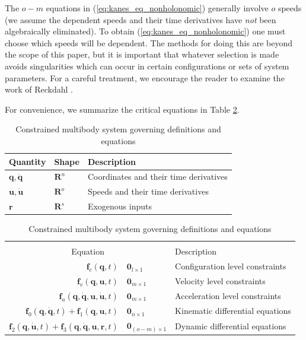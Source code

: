 \documentclass[smallcondensed,final]{svjour3}                     %
\begin{document}
The $o-m$ equations in (\ref{eq:kanes_eq_nonholonomic}) generally involve $o$
speeds (we assume the dependent speeds and their time derivatives have
\textit{not} been algebraically eliminated). To obtain
(\ref{eq:kanes_eq_nonholonomic}) one must choose which speeds will be
dependent.  The methods for doing this are beyond the scope of this paper, but
it is important that whatever selection is made avoids singularities which can
occur in certain configurations or sets of system parameters. For a careful
treatment, we encourage the reader to examine the work of Reckdahl
\cite{Reckdahl1996}.

For convenience, we summarize the critical equations in Table
\ref{table:assumptions}.


\begin{table}[htbp]
  \centering
  \caption{Constrained multibody system governing definitions and equations}
  \label{table:assumptions}
  \begin{tabular}[c]{l l l}
    Quantity & Shape & Description\\
    \hline
    $\bm{q},\bm{\dot{q}}$ & $\mathbf{R}^n$ & Coordinates and their time
    derivatives\\
    $\bm{u}, \bm{\dot{u}}$ & $\mathbf{R}^o$ & Speeds and their time derivatives\\
    $\bm{r}$ & $\mathbf{R}^s$ & Exogenous inputs \\
  \end{tabular}
  \begin{tabular}[c]{r @{ $=$ } l l}
    \multicolumn{3}{c}{ } \\
    \multicolumn{2}{c}{Equation} & Description \\
    \hline
    $\bm{f}_{c}(\bm{q}, t)$ & $\bm{0}_{l \times 1}$ & Configuration level constraints \\
    $\bm{f}_{v}(\bm{q}, \bm{u}, t)$ & $\bm{0}_{m \times 1}$ & Velocity level constraints \\
    $\bm{f}_{a}(\bm{q}, \bm{\dot{q}}, \bm{u}, \bm{\dot{u}}, t)$ & $\bm{0}_{m
    \times 1}$ & Acceleration level constraints \\
    $\bm{f}_{0}(\bm{q}, \bm{\dot{q}}, t) + \bm{f}_{1}(\bm{q}, \bm{u}, t)$ &
    $\bm{0}_{n \times 1}$ & Kinematic differential equations \\
    $\bm{f}_{2}(\bm{q}, \bm{\dot{u}}, t) + \bm{f}_{3}(\bm{q}, \bm{\dot{q}},
    \bm{u}, \bm{r}, t)$ & $\bm{0}_{(o - m) \times 1}$ & Dynamic differential equations
  \end{tabular}
\end{table}
\end{document}
